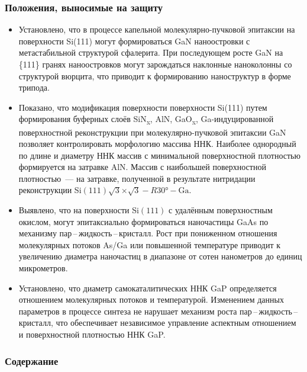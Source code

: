 \begin{frame}
    \setcounter{framenumber}{1}
    \maketitle
\end{frame}

\begin{frame}
    \frametitle{Положения, выносимые на защиту}
    \begin{itemize}
\item Установлено, что в процессе капельной молекулярно-пучковой эпитаксии на
поверхности Si(111) могут формироваться GaN наноостровки с метастабильной
структурой сфалерита. При последующем росте GaN
на \{111\} гранях наноостровков могут зарождаться наклонные наноколонны со
структурой вюрцита, что приводит к формированию наноструктур в форме
трипода.
\item Показано, что модификация поверхности поверхности Si(111) путем формирования буферных слоёв SiN\textsubscript{x}, AlN, GaO\textsubscript{x}, Ga-индуцированной поверхностной реконструкции при молекулярно-пучковой эпитаксии GaN позволяет контролировать морфологию массива ННК. Наиболее однородный по длине и диаметру ННК массив с минимальной поверхностной плотностью
формируется на затравке AlN. Массив с наибольшей поверхностной плотностью~--- на затравке, полученной в результате нитридации реконструкции
Si\((111)\sqrt{3}\)\(\times\)\(\sqrt{3} - R30\si{\degree} - \text{Ga}\).
\item Выявлено, что на поверхности Si\((111)\) с
удалённым поверхностным окислом, могут эпитаксиально формироваться наночастицы GaAs по механизму пар\,--\,жидкость\,--\,кристалл. Рост при пониженном
отношения молекулярных потоков As/Ga или повышенной температуре приводит к
увеличению диаметра наночастиц в диапазоне от сотен нанометров до единиц
микрометров.
\item Установлено, что диаметр самокаталитических ННК GaP определяется
отношением молекулярных потоков и температурой. Изменением данных
параметров в процессе синтеза не нарушает механизм роста
пар\,--\,жидкость\,--\,кристалл, что обеспечивает независимое управление
аспектным отношением и поверхностной плотностью ННК GaP.
    \end{itemize}
\end{frame}

\begin{frame}
    \frametitle{Содержание}
    \tableofcontents
\end{frame}
